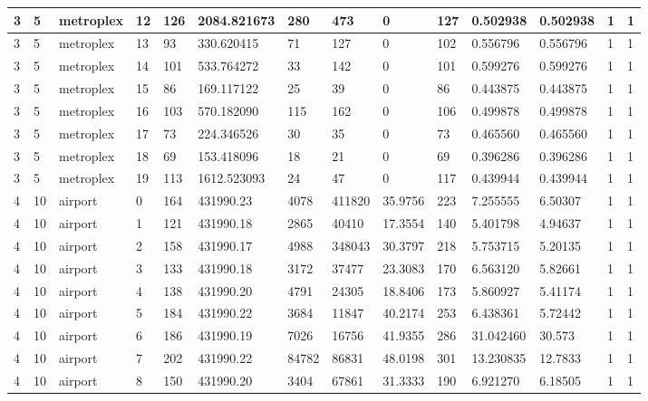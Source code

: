 \documentclass[../thesis.tex]{subfiles}
\begin{document}
\begin{table}[!ht]
\begin{tabularx}{\textwidth}{|X|X|X|X|X|X|X|X|X|X|X|X|X|X|}
        3 & 5 & metroplex & 12 & 126 & 2084.821673 & 280 & 473 & 0 & 127 & 0.502938 & 0.502938 & 1 & 1 \\ \hline
        3 & 5 & metroplex & 13 & 93 & 330.620415 & 71 & 127 & 0 & 102 & 0.556796 & 0.556796 & 1 & 1 \\ \hline
        3 & 5 & metroplex & 14 & 101 & 533.764272 & 33 & 142 & 0 & 101 & 0.599276 & 0.599276 & 1 & 1 \\ \hline
        3 & 5 & metroplex & 15 & 86 & 169.117122 & 25 & 39 & 0 & 86 & 0.443875 & 0.443875 & 1 & 1 \\ \hline
        3 & 5 & metroplex & 16 & 103 & 570.182090 & 115 & 162 & 0 & 106 & 0.499878 & 0.499878 & 1 & 1 \\ \hline
        3 & 5 & metroplex & 17 & 73 & 224.346526 & 30 & 35 & 0 & 73 & 0.465560 & 0.465560 & 1 & 1 \\ \hline
        3 & 5 & metroplex & 18 & 69 & 153.418096 & 18 & 21 & 0 & 69 & 0.396286 & 0.396286 & 1 & 1 \\ \hline
        3 & 5 & metroplex & 19 & 113 & 1612.523093 & 24 & 47 & 0 & 117 & 0.439944 & 0.439944 & 1 & 1 \\ \hline
        4 & 10 & airport & 0 & 164 & 431990.23 & 4078 & 411820 & 35.9756 & 223 & 7.255555 & 6.50307 & 1 & 1 \\ \hline
        4 & 10 & airport & 1 & 121 & 431990.18 & 2865 & 40410 & 17.3554 & 140 & 5.401798 & 4.94637 & 1 & 1 \\ \hline
        4 & 10 & airport & 2 & 158 & 431990.17 & 4988 & 348043 & 30.3797 & 218 & 5.753715 & 5.20135 & 1 & 1 \\ \hline
        4 & 10 & airport & 3 & 133 & 431990.18 & 3172 & 37477 & 23.3083 & 170 & 6.563120 & 5.82661 & 1 & 1 \\ \hline
        4 & 10 & airport & 4 & 138 & 431990.20 & 4791 & 24305 & 18.8406 & 173 & 5.860927 & 5.41174 & 1 & 1 \\ \hline
        4 & 10 & airport & 5 & 184 & 431990.22 & 3684 & 11847 & 40.2174 & 253 & 6.438361 & 5.72442 & 1 & 1 \\ \hline
        4 & 10 & airport & 6 & 186 & 431990.19 & 7026 & 16756 & 41.9355 & 286 & 31.042460 & 30.573 & 1 & 1 \\ \hline
        4 & 10 & airport & 7 & 202 & 431990.22 & 84782 & 86831 & 48.0198 & 301 & 13.230835 & 12.7833 & 1 & 1 \\ \hline
        4 & 10 & airport & 8 & 150 & 431990.20 & 3404 & 67861 & 31.3333 & 190 & 6.921270 & 6.18505 & 1 & 1 \\ \hline

\end{tabularx}
\end{table}
\end{document}
